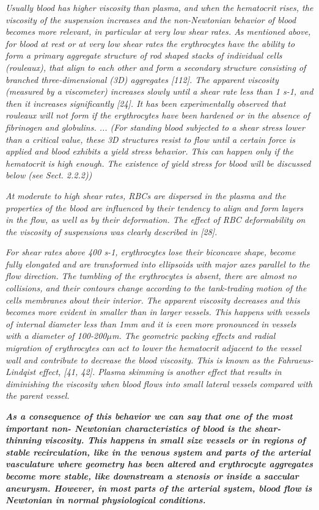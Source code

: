 \documentclass[11pt,letterpaper]{article}
\begin{document}
\textit{Usually blood has higher viscosity than plasma, and when the hematocrit rises,
the viscosity of the suspension increases and the non-Newtonian behavior of blood becomes more relevant, in particular at very low shear rates. As mentioned above, for blood at rest or at very low shear rates the erythrocytes have the ability to form a primary aggregate structure of rod shaped stacks of individual cells (rouleaux), that align to each other and form a secondary structure consisting of branched three-dimensional (3D) aggregates [112]. The apparent viscosity (measured by a viscometer) increases slowly until a shear rate less than 1 s-1, and then it increases significantly [24]. It has been experimentally observed that rouleaux will not form if the erythrocytes have been hardened or in the absence of fibrinogen and globulins. ... (For standing blood subjected to a shear stress lower than a critical value, these 3D structures resist to flow until a certain force is applied and blood exhibits a yield stress behavior. This can happen only if the hematocrit is high enough. The existence of yield stress for blood will be discussed below (see Sect. 2.2.2))}

\textit{At moderate to high shear rates, RBCs are dispersed in the plasma and the properties of the blood are influenced by their tendency to align and form layers in the flow, as well as by their deformation. The effect of RBC deformability on the viscosity of suspensions was clearly described in [28].}

\textit{For shear rates above 400 s-1, erythrocytes lose their biconcave shape, become fully elongated and are transformed into ellipsoids with major axes parallel to the flow direction. The tumbling of the erythrocytes is absent, there are almost no collisions, and their contours change according to the tank-trading motion of the cells membranes about their interior. The apparent viscosity decreases and this becomes more evident in smaller than in larger vessels. This happens with vessels of internal diameter less than 1mm and it is even more pronounced in vessels with a diameter of 100-200$\mu$m. The geometric packing effects and radial migration of erythrocytes can act to lower the hematocrit adjacent to the vessel wall and contribute to decrease the blood viscosity. This is known as the Fahraeus-Lindqist effect, [41, 42]. Plasma skimming is another effect that results in diminishing the viscosity when blood flows into small lateral vessels compared with the parent vessel.}

\textbf{\textit{As a consequence of this behavior we can say that one of the most important non-
Newtonian characteristics of blood is the shear-thinning viscosity. This happens in small size vessels or in regions of stable recirculation, like in the venous system and parts of the arterial vasculature where geometry has been altered and erythrocyte aggregates become more stable, like downstream a stenosis or inside a saccular aneurysm. However, in most parts of the arterial system, blood flow is Newtonian in normal physiological conditions.}}
\end{document}
